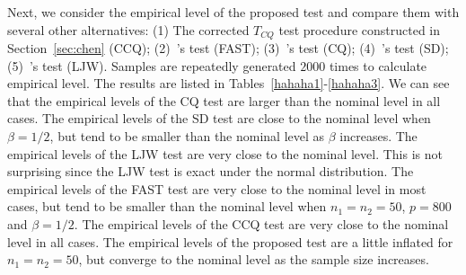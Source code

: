 \documentclass[3p]{elsarticle}
\theoremstyle{plain}
\theoremstyle{definition}
\theoremstyle{remark}
\begin{document}
Next, we consider the empirical level of the proposed test and compare them with several other alternatives: (1) The corrected $T_{CQ}$ test procedure constructed in Section~\ref{sec:chen} (CCQ); (2)~\cite{Ma2015A}'s test (FAST); (3)~\cite{Chen2010A}'s test (CQ); (4)~\cite{Srivastava2008A}'s test (SD); (5)~\cite{Lopes2015A}'s test (LJW).
Samples are repeatedly generated $2000$ times to calculate empirical level.
The results are listed in Tables~\ref{hahaha1}-\ref{hahaha3}.
We can see that the empirical levels of the CQ test are larger than the nominal level in all cases.
The empirical levels of the SD test are close to the nominal level when $\beta=1/2$, but tend to be smaller than the nominal level as $\beta$ increases.
 The empirical levels of the LJW test are very close to the nominal level.
 This is not surprising since the LJW test is exact under the normal distribution.
The empirical levels of the FAST test are very close to the nominal level in most cases, but tend to be smaller than the nominal level when $n_1=n_2=50$, $p=800$ and $\beta=1/2$.
The empirical levels of the CCQ test are very close to the nominal level in all cases.
The empirical levels of the proposed test are a little inflated for $n_1=n_2=50$, but converge to the nominal level as the sample size increases.
\end{document}
